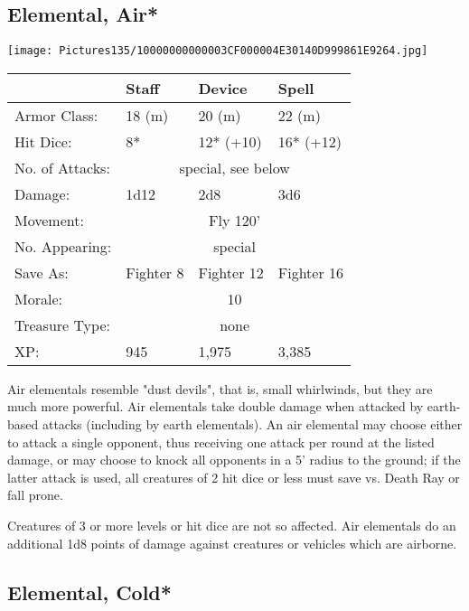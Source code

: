 \documentclass[a4paper,twoside,openany,10pt]{book}
\begin{document}
\begin{multicols}{2}
\subsection*{Elemental, Air*}\label{elemental-air}

\begin{center}
	\texttt{[image: Pictures135/10000000000003CF000004E30140D999861E9264.jpg]}
\end{center}

\begin{tabularx}{0.48\textwidth}[]{@{}lXXX@{}}
& Staff & Device & Spell \\\hline
Armor Class: & 18 (m) & 20 (m) & 22 (m) \\\hline
Hit Dice: & 8* & 12* (+10) & 16* (+12) \\\hline
No. of Attacks: & \multicolumn{3}{c}{special, see below} \\\hline
Damage: & 1d12 & 2d8 & 3d6 \\\hline
Movement: & \multicolumn{3}{c}{Fly 120'} \\\hline
No. Appearing: &  \multicolumn{3}{c}{special} \\\hline
Save As: & Fighter 8 & Fighter 12 & Fighter 16 \\\hline
Morale: & \multicolumn{3}{c}{10} \\\hline
Treasure Type: & \multicolumn{3}{c}{none} \\\hline
XP: & 945 & 1,975 & 3,385 \\\hline
\end{tabularx}\medskip



Air elementals resemble "dust devils", that is, small whirlwinds, but they are much more powerful. Air elementals take double damage when attacked by earth-based attacks (including by earth elementals). An air elemental may choose either to attack a single opponent, thus receiving one attack per round at the listed damage, or may choose to knock all opponents in a 5' radius to the ground; if the latter attack is used, all creatures of 2 hit dice or less must save vs. Death Ray or fall prone. 

Creatures of 3 or more levels or hit dice are not so affected. Air elementals do an additional 1d8 points of damage against creatures or vehicles which are airborne.

\subsection*{Elemental, Cold*}\label{elemental-cold}


\end{multicols}
\end{document}

